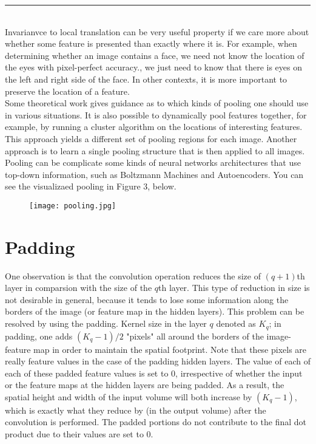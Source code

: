 \documentclass[11pt]{article}
\begin{document}
\par\noindent\rule{\textwidth}{0.5pt}\\
Invarianvce to local translation can be very useful property if we care more about whether some feature is presented than exactly where it is. For example, when determining whether an image contains a face, we need not know the location of the eyes with pixel-perfect accuracy., we just need to know that there is eyes on the left and right side of the face. In other contexts, it is more important to preserve the location of a feature. \\
Some theoretical work gives guidance as to which kinds of pooling one should use in various situations. It is also possible to dynamically pool features together, for example, by running a cluster algorithm on the locations of interesting features. This approach yields a different set of pooling regions for each image. Another approach is to learn a single pooling structure that is then applied to all images.\\
Pooling can be complicate some kinds of neural networks architectures that use top-down information, such as Boltzmann Machines and Autoencoders. You can see the visualizaed pooling in Figure 3, below. 
\begin{figure}[H]

\centering
\texttt{[image: pooling.jpg]}
\caption{}
\label{fig:figure3}
\end{figure}
\section{Padding}
\hspace*{1cm} One observation is that the convolution operation reduces the size of $(q+1)$th layer in comparsion with the size of the $q$th layer. This type of reduction in size is not desirable in general, because it tends to lose some information along the borders of the image (or feature map in the hidden layers). This problem can be resolved by using the padding. Kernel size in the layer $q$ denoted as $K_q$; in padding, one adds $(K_q-1)/2$ "pixels" all around the borders of the image-feature map in order to maintain the spatial footprint. Note that these pixels are really feature values in the case of the padding hidden layers. The value of each of each of these padded feature values is set to 0, irrespective of whether the input or the feature maps at the hidden layers are being padded. As a result, the spatial height and width of the input volume will both increase by $(K_q-1)$, which is exactly what they reduce by (in the output volume) after the convolution is performed. The padded portions do not contribute to the final dot product due to their values are set to 0. 
\end{document}

